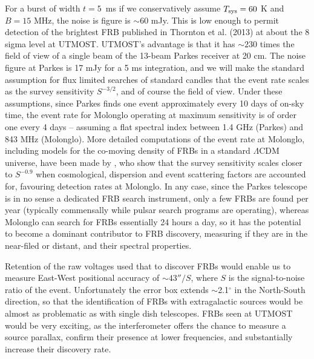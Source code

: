 For a burst of width $t=5$\, ms if we conservatively assume $T_{\rm sys} = 60$ K and $B = 15$ MHz, the noise is figure is $\sim 60$ mJy. This is low enough to permit detection of the brightest FRB published in Thornton et al. (2013) at about the 8 sigma level at UTMOST. UTMOST's advantage is that it has $\sim 230$ times the field of view of a single beam of the 13-beam Parkes receiver at 20 cm. The noise figure at Parkes is 17 mJy for a 5 ms integration, and we will make the standard assumption for flux limited searches of standard candles that the event rate scales as the survey sensitivity $S^{-3/2}$, and of course the field of view. Under these assumptions, since Parkes finds one event approximately every 10 days of on-sky time, the event rate for Molonglo operating at maximum sensitivity is of order one every 4 days -- assuming a flat spectral index between 1.4 GHz (Parkes) and 843 MHz (Molonglo). More detailed computations of the event rate at Molonglo, including models for the co-moving density of FRBs in a standard $\Lambda$CDM universe, have been made by \cite{Caleb2015}, who show that the survey sensitivity scales closer to $S^{-0.9}$ when cosmological, dispersion and event scattering factors are accounted for, favouring detection rates at Molonglo. In any case, since the Parkes telescope is in no sense a dedicated FRB search instrument, only a few FRBs are found per year (typically commensally while pulsar search programs are operating), whereas Molonglo can search for FRBs essentially 24 hours a day, so it has the potential to become a dominant contributor to FRB discovery, measuring if they are in the near-filed or distant, and their spectral properties. 

Retention of the raw voltages used that to discover FRBs would enable us to measure East-West positional accuracy of $\sim 43''/S$, where $S$ is the signal-to-noise ratio of the event. Unfortunately the error box extends $\sim$2.1$^{\circ}$ in the North-South direction, so that the identification of FRBs with extragalactic sources would be almost as problematic as with single dish telescopes. FRBs seen at UTMOST would be very exciting, as the interferometer offers the chance to measure a source parallax, confirm their presence at lower frequencies, and substantially increase their discovery rate. 
  
  